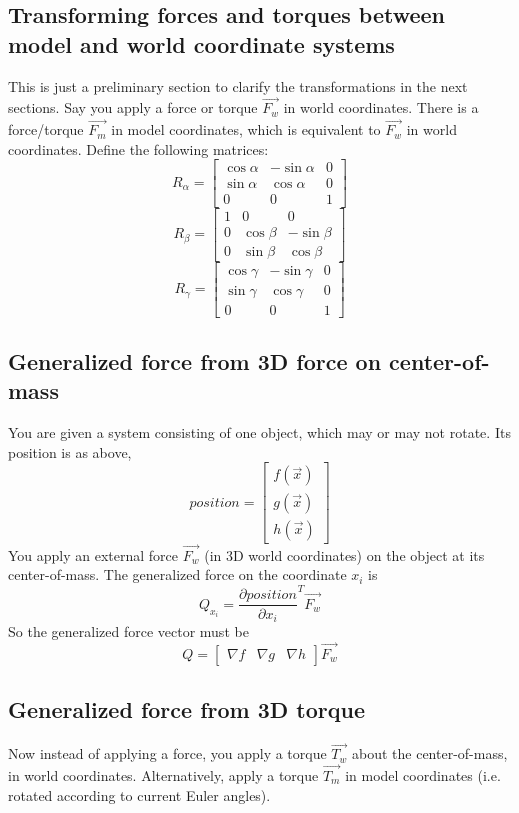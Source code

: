 \documentclass{article}
\begin{document}
\subsection{Transforming forces and torques between model and world coordinate systems}
This is just a preliminary section to clarify the transformations in the next sections.
Say you apply a force or torque \(\overrightarrow{F_w}\) in world coordinates.
There is a force/torque \(\overrightarrow{F_m}\) in model coordinates, which is equivalent to \(\overrightarrow{F_w}\) in world coordinates.
Define the following matrices:
\[ R_\alpha = \begin{bmatrix} \cos\alpha & -\sin\alpha & 0 \\ \sin\alpha & \cos\alpha & 0 \\ 0 & 0 & 1 \end{bmatrix} \]
\[ R_\beta = \begin{bmatrix} 1 & 0 & 0 \\ 0 & \cos\beta & -\sin\beta \\ 0 & \sin\beta & \cos\beta \end{bmatrix} \]
\[ R_\gamma = \begin{bmatrix} \cos\gamma & -\sin\gamma & 0 \\ \sin\gamma & \cos\gamma & 0 \\ 0 & 0 & 1 \end{bmatrix} \]

\subsection{Generalized force from 3D force on center-of-mass}
You are given a system consisting of one object, which may or may not rotate. Its position is as above,
\[ position = \begin{bmatrix} f(\overrightarrow{x}) \\ g(\overrightarrow{x}) \\ h(\overrightarrow{x}) \end{bmatrix} \]
You apply an external force \(\overrightarrow{F_w}\) (in 3D world coordinates) on the object at its center-of-mass.
The generalized force on the coordinate \(x_i\) is
\[ Q_{x_i} = \frac{\partial position}{\partial x_i}^T \overrightarrow{F_w} \]
So the generalized force vector must be
\[ Q = \begin{bmatrix} \nabla f & \nabla g & \nabla h \end{bmatrix} \overrightarrow{F_w} \]

\subsection{Generalized force from 3D torque}
Now instead of applying a force, you apply a torque \(\overrightarrow{T_w}\) about the center-of-mass, in world coordinates.
Alternatively, apply a torque \(\overrightarrow{T_m}\) in model coordinates (i.e. rotated according to current Euler angles).
\newpage
\end{document}
